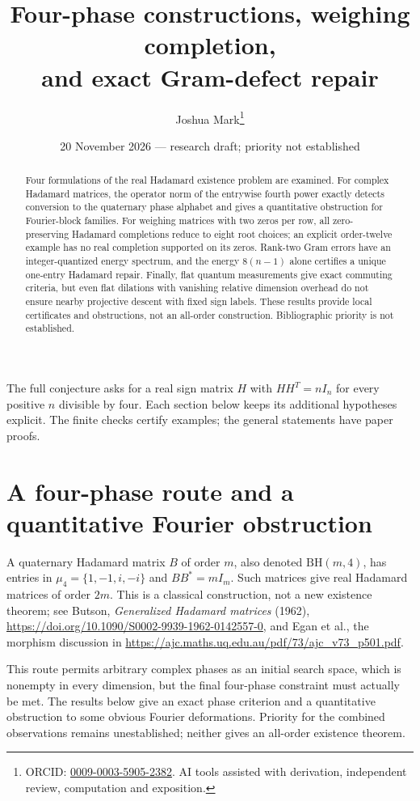 \documentclass[11pt]{article}
\title{Four-phase constructions, weighing completion,\\and exact Gram-defect repair}
\author{Joshua Mark\thanks{ORCID: \href{https://orcid.org/0009-0003-5905-2382}{0009-0003-5905-2382}. AI tools assisted with derivation, independent review, computation and exposition.}}
\date{20 November 2026 --- research draft; priority not established}
\begin{document}
\maketitle

\begin{abstract}
Four formulations of the real Hadamard existence problem are examined.
For complex Hadamard matrices, the operator norm of the entrywise fourth
power exactly detects conversion to the quaternary phase alphabet and
gives a quantitative obstruction for Fourier-block families.
For weighing matrices with two zeros per row, all zero-preserving
Hadamard completions reduce to eight root choices; an explicit
order-twelve example has no real completion supported on its zeros.
Rank-two Gram errors have an integer-quantized energy spectrum, and
the energy $8(n-1)$ alone certifies a unique one-entry Hadamard repair.
Finally, flat quantum measurements give exact commuting criteria,
but even flat dilations with vanishing relative dimension overhead
do not ensure nearby projective descent with fixed sign labels.
These results provide local certificates and obstructions, not an
all-order construction. Bibliographic priority is not established.
\end{abstract}
The full conjecture asks for a real sign matrix $H$ with
$HH^T=nI_n$ for every positive $n$ divisible by four.
Each section below keeps its additional hypotheses explicit.
The finite checks certify examples; the general statements have paper proofs.
\section{A four-phase route and a quantitative Fourier obstruction}
\label{sec:four-phase-route}

A quaternary Hadamard matrix $B$ of order $m$, also denoted
$\mathrm{BH}(m,4)$, has entries in $\mu_4=\{1,-1,i,-i\}$ and
$BB^*=mI_m$. Such matrices give real Hadamard matrices of order
$2m$. This is a classical construction, not a new existence theorem;
see Butson, \emph{Generalized Hadamard matrices} (1962),
\url{https://doi.org/10.1090/S0002-9939-1962-0142557-0},
and Egan et al., the morphism discussion in
\url{https://ajc.maths.uq.edu.au/pdf/73/ajc_v73_p501.pdf}.

This route permits arbitrary complex phases as an initial search
space, which is nonempty in every dimension, but the final four-phase
constraint must actually be met. The results below give an exact
phase criterion and a quantitative obstruction to some obvious
Fourier deformations. Priority for the combined observations remains
unestablished; neither gives an all-order existence theorem.
\end{document}
